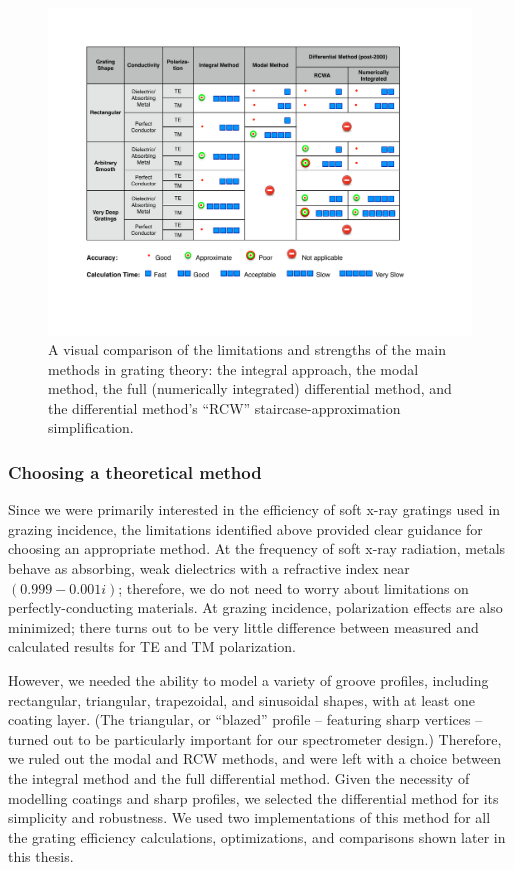 \begin{figure}[htbp] %
   \centering
   \includegraphics[scale=0.8]{../data/Chapter2/2e_methodComparision/methodComparisonTable_noPre2000.pdf} 
   \caption[A visual comparison of the limitations and strengths of the main methods in grating theory.]{A visual comparison of the limitations and strengths of the main methods in grating theory: the integral approach, the modal method, the full (numerically integrated) differential method, and the differential method's ``RCW'' staircase-approximation simplification.}
   \label{2e}
\end{figure}
 

\subsubsection{Choosing a theoretical method}
Since we were primarily interested in the efficiency of soft x-ray gratings used in grazing incidence, the limitations identified above provided clear guidance for choosing an appropriate method.  At the frequency of soft x-ray radiation, metals behave as absorbing, weak dielectrics with a refractive index near $(0.999 - 0.001i)$; therefore, we do not need to worry about limitations on perfectly-conducting materials.  At grazing incidence, polarization effects are also minimized; there turns out to be very little difference between measured and calculated results for TE and TM polarization.

However, we needed the ability to model a variety of groove profiles, including rectangular, triangular, trapezoidal, and sinusoidal shapes, with at least one coating layer.  (The triangular, or ``blazed'' profile -- featuring sharp vertices -- turned out to be particularly important for our spectrometer design.)  Therefore, we ruled out the modal and RCW methods, and were left with a choice between the integral method and the full differential method.    Given the necessity of modelling coatings and sharp profiles, we selected the differential method for its simplicity and robustness.  We used two implementations of this method for all the grating efficiency calculations, optimizations, and comparisons shown later in this thesis.


